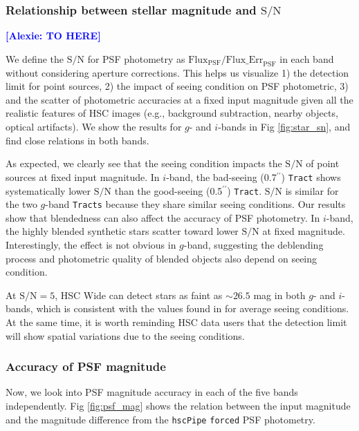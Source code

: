 \documentclass[useamsfonts]{pasj01}
\def\asec{$^{\prime\prime}$}
\newcommand{\alexie}[1]{\textcolor{blue}{\textbf{[Alexie: #1]}}}
\def\hscpipe{\texttt{hscPipe}}
\def\forced{\texttt{forced}}
\def\tract{\texttt{Tract}}
\def\tracts{\texttt{Tracts}}
\def\s2n{{$\mathrm{S}/\mathrm{N}$}}
\begin{document}
\subsubsection{Relationship between stellar magnitude and \s2n{}}

\alexie{TO HERE}

We define the  \s2n{} for PSF photometry as
    $\mathrm{Flux}_{\mathrm{PSF}}/\mathrm{Flux\_Err}_{\mathrm{PSF}}$ in each band
    without considering aperture corrections.
    This helps us visualize
    1) the detection limit for point sources,
    2) the impact of seeing condition on PSF photometric,
    3) and the scatter of photometric accuracies at a fixed input magnitude given all
       the realistic features of HSC images (e.g., background subtraction, nearby
       objects, optical artifacts).
    We show the results for $g$- and $i$-bands in Fig \ref{fig:star_sn}, and find close
    relations in both bands.

    As expected, we clearly see that the seeing condition impacts the \s2n{} of point
    sources at fixed input magnitude.
    In  $i$-band, the bad-seeing (0.7\asec{}) \tract{}  shows systematically
    lower \s2n{} than the good-seeing (0.5\asec{}) \tract{}.
     \s2n{} is similar for the two $g$-band \tracts{} because they share similar seeing conditions.
    Our results show that blendedness can also affect the accuracy of PSF photometry.
    In $i$-band, the highly blended synthetic stars scatter toward lower \s2n{} at
    fixed magnitude.
    Interestingly, the effect is not obvious in $g$-band, suggesting the deblending
    process and photometric quality of blended objects also depend on seeing condition.

    At \s2n{}$=5$, HSC Wide can detect stars as faint as ${\sim}26.5$ mag in both $g$- and
    $i$-bands, which is consistent with the values found
    in \citet{HSCDR1} for average seeing conditions.
    At the same time, it is worth reminding HSC data users that the detection
    limit will show spatial variations due to the seeing conditions.

\subsubsection{Accuracy of PSF magnitude}

    Now, we look into PSF magnitude accuracy in each of the five bands
    independently.
    Fig \ref{fig:psf_mag} shows the relation between the input magnitude and the
    magnitude difference from the \hscpipe{} \forced{} PSF photometry.
\end{document}
